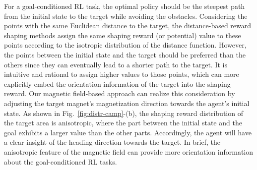 \documentclass[journal]{IEEEtran}
\begin{document}
For a goal-conditioned RL task, the optimal policy should be the steepest path from the initial state to the target while avoiding the obstacles.
Considering the points with the same Euclidean distance to the target, the distance-based reward shaping methods assign the same shaping reward (or potential) value to these points according to the isotropic distribution of the distance function.
However, the points between the initial state and the target should be preferred than the others since they can eventually lead to a shorter path to the target.
It is intuitive and rational to assign higher values to those points, which can more explicitly embed the orientation information of the target into the shaping reward.
Our magnetic field-based approach can realize this consideration by adjusting the target magnet's magnetization direction towards the agent's initial state.
As shown in Fig.~\ref{fig:distr-camp}-(b), the shaping reward distribution of the target area is anisotropic, where the part between the initial state and the goal exhibits a larger value than the other parts.
Accordingly, the agent will have a clear insight of the heading direction towards the target.
In brief, the anisotropic feature of the magnetic field can provide more orientation information about the goal-conditioned RL tasks.
\end{document}
